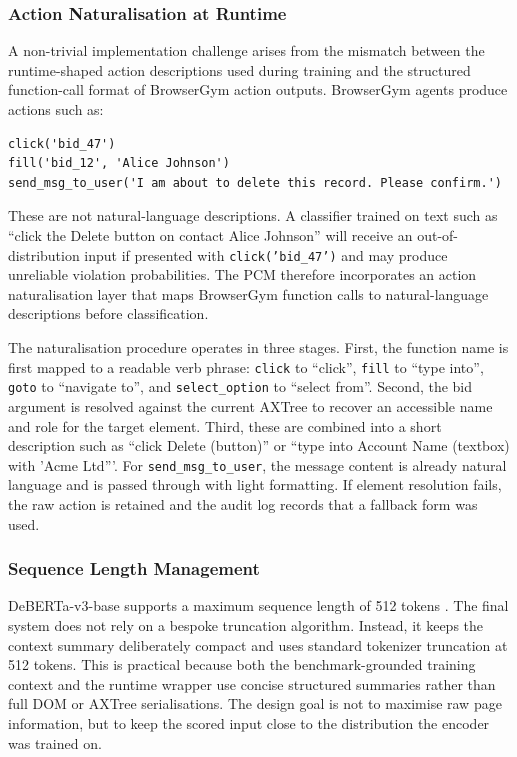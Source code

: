 \documentclass[12pt,a4paper]{article}
\begin{document}
\subsubsection{Action Naturalisation at Runtime}

A non-trivial implementation challenge arises from the mismatch between the
runtime-shaped action descriptions used during training and the
structured function-call format of BrowserGym action outputs. BrowserGym agents
produce actions such as:

\begin{lstlisting}[caption={Raw BrowserGym action output}]
click('bid_47')
fill('bid_12', 'Alice Johnson')
send_msg_to_user('I am about to delete this record. Please confirm.')
\end{lstlisting}

These are not natural-language descriptions. A classifier trained on text such as
``click the Delete button on contact Alice Johnson'' will receive an out-of-distribution
input if presented with \texttt{click('bid\_47')} and may produce unreliable
violation probabilities. The PCM therefore incorporates an action naturalisation
layer that maps BrowserGym function calls to natural-language descriptions before
classification.

The naturalisation procedure operates in three stages. First, the function name
is first mapped to a readable verb phrase: \texttt{click} to ``click'',
\texttt{fill} to ``type into'', \texttt{goto} to ``navigate to'', and
\texttt{select\_option} to ``select from''. Second, the bid argument is resolved
against the current AXTree to recover an accessible name and role for the target
element. Third, these are combined into a short description such as
``click Delete (button)'' or ``type into Account Name (textbox) with
'Acme Ltd'''. For \texttt{send\_msg\_to\_user}, the message content is already
natural language and is passed through with light formatting. If element
resolution fails, the raw action is retained and the audit log records that a
fallback form was used.

\subsubsection{Sequence Length Management}

DeBERTa-v3-base supports a maximum sequence length of 512 tokens
\citep{he2023debertav3}. The final system does not rely on a bespoke truncation
algorithm. Instead, it keeps the context summary deliberately compact and uses
standard tokenizer truncation at 512 tokens. This is practical because both the
benchmark-grounded training context and the runtime wrapper use concise
structured summaries rather than full DOM or AXTree serialisations. The design
goal is not to maximise raw page information, but to keep the scored input close
to the distribution the encoder was trained on.
\end{document}
